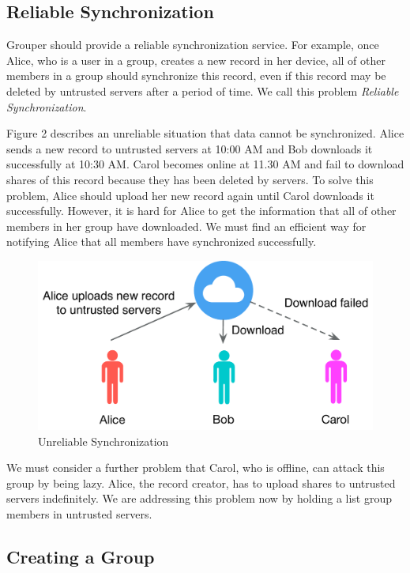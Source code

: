 \documentclass[twocolumn,10pt]{article}
\begin{document}
\subsection{Reliable Synchronization}
Grouper should provide a reliable synchronization service. For example, once Alice, who is a user in a group, creates a new record in her device, all of other members in a group should synchronize this record, even if this record may be deleted by untrusted servers after a period of time. We call this problem \emph{Reliable Synchronization}.

Figure 2 describes an unreliable situation that data cannot be synchronized. Alice sends a new record to untrusted servers at 10:00 AM and Bob downloads it successfully at 10:30 AM. Carol becomes online at 11.30 AM and fail to download shares of this record because they has been deleted by servers. To solve this problem, Alice should upload her new record again until Carol downloads it successfully. However, it is hard for Alice to get the information that all of other members in her group have downloaded. We must find an efficient way for notifying Alice that all members have synchronized successfully.

\begin{figure}[t]
	\centering
	\includegraphics[scale=0.35]{unreliabe_sync}
	\caption{Unreliable Synchronization}
\end{figure}

We must consider a further problem that Carol, who is offline, can attack this group by being lazy. Alice, the record creator, has to upload shares to untrusted servers indefinitely. We are addressing this problem now by holding a list group members in untrusted servers.

\subsection{Creating a Group}
\end{document}
